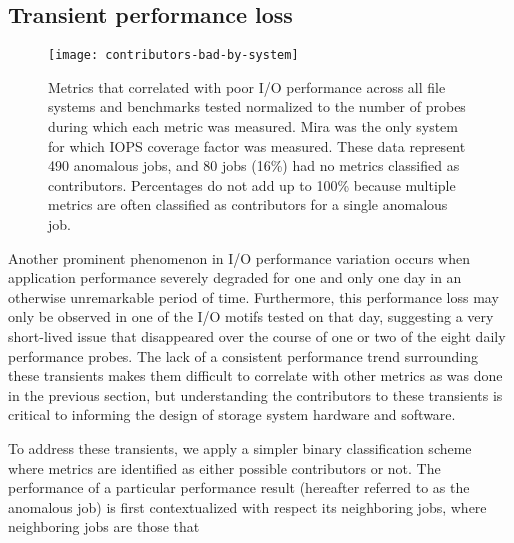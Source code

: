 \subsection{Transient performance loss} \label{sec:results/shortterm}



\begin{figure}
    \centering
    \texttt{[image: contributors-bad-by-system]}
    \vspace{-.35in}
    \caption{Metrics that correlated with poor I/O performance across all file systems and benchmarks tested normalized to the number of probes during which each metric was measured.
    Mira was the only system for which IOPS coverage factor was measured. 
    These data represent 490 anomalous jobs, and 80 jobs (16\%) had no metrics classified as contributors.
    Percentages do not add up to 100\% because multiple metrics are often classified as contributors for a single anomalous job.
    }
    \label{fig:contributors-bad-by-system}
\end{figure}

Another prominent phenomenon in I/O performance variation occurs when application performance severely degraded for one and only one day in an otherwise unremarkable period of time.
Furthermore, this performance loss may only be observed in one of the I/O motifs tested on that day, suggesting a very short-lived issue that disappeared over the course of one or two of the eight daily performance probes.
The lack of a consistent performance trend surrounding these transients makes them difficult to correlate with other metrics as was done in the previous section, but understanding the contributors to these transients is critical to informing the design of storage system hardware and software.

To address these transients, we apply a simpler binary classification scheme where metrics are identified as either possible contributors or not.
The performance of a particular performance result (hereafter referred to as the anomalous job) is first contextualized with respect its neighboring jobs, where neighboring jobs are those that


